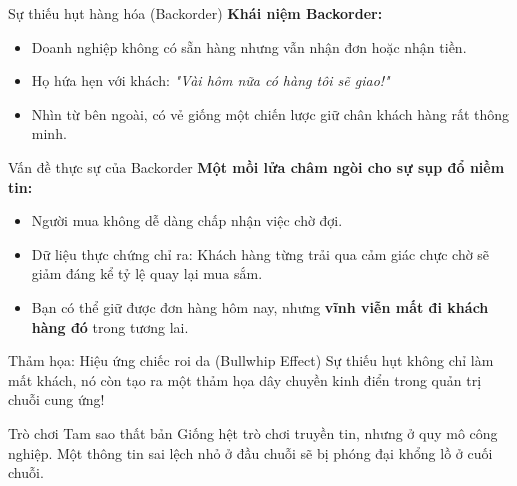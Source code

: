 \documentclass[aspectratio=169]{beamer}
\begin{document}
\begin{frame}{Sự thiếu hụt hàng hóa (Backorder)}
    \textbf{Khái niệm Backorder:}
    \begin{itemize}
        \item Doanh nghiệp không có sẵn hàng nhưng vẫn nhận đơn hoặc nhận tiền.
        \item Họ hứa hẹn với khách: \textit{"Vài hôm nữa có hàng tôi sẽ giao!"}
        \item Nhìn từ bên ngoài, có vẻ giống một chiến lược giữ chân khách hàng rất thông minh.
    \end{itemize}
\end{frame}

\begin{frame}{Vấn đề thực sự của Backorder}
    \textbf{Một mồi lửa châm ngòi cho sự sụp đổ niềm tin:}
    \begin{itemize}
        \item Người mua không dễ dàng chấp nhận việc chờ đợi.
        \item Dữ liệu thực chứng chỉ ra: Khách hàng từng trải qua cảm giác chực chờ sẽ giảm đáng kể tỷ lệ quay lại mua sắm.
        \item Bạn có thể giữ được đơn hàng hôm nay, nhưng \textbf{vĩnh viễn mất đi khách hàng đó} trong tương lai.
    \end{itemize}
\end{frame}

\begin{frame}{Thảm họa: Hiệu ứng chiếc roi da (Bullwhip Effect)}
    Sự thiếu hụt không chỉ làm mất khách, nó còn tạo ra một thảm họa dây chuyền kinh điển trong quản trị chuỗi cung ứng!
    \begin{block}{Trò chơi Tam sao thất bản}
        Giống hệt trò chơi truyền tin, nhưng ở quy mô công nghiệp. Một thông tin sai lệch nhỏ ở đầu chuỗi sẽ bị phóng đại khổng lồ ở cuối chuỗi.
    \end{block}
\end{frame}
\end{document}
